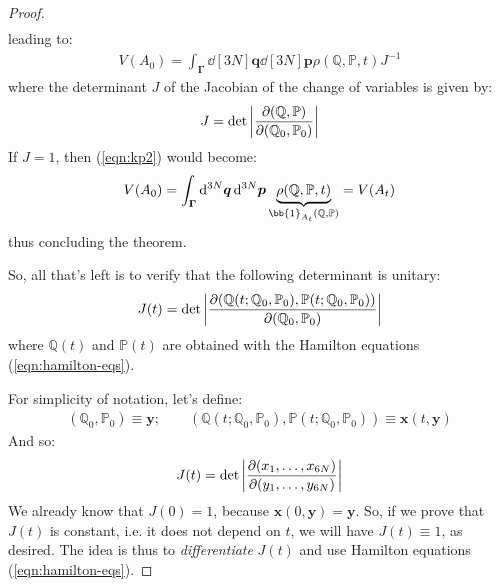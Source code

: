\documentclass[../../main.tex]{subfiles}
\begin{document}
\begin{proof}
\begin{align}
    \end{align}
    leading to:
    \begin{align*}
        V(A_0) = \int_{\bm{\Gamma}} \dd[3N]{\bm{q}} \dd[3N]{\bm{p}} \rho(\mathbb{Q}, \mathbb{P}, t) J^{-1} 
    \end{align*}
    where the determinant $J$ of the Jacobian of the change of variables is given by:
    \begin{align*}
        J = \operatorname{det}\left| \pdv{(\mathbb{Q}, \mathbb{P})}{(\mathbb{Q}_0, \mathbb{P}_0)}\right|
    \end{align*}
    If $J = 1$, then (\ref{eqn:kp2}) would become:
    \begin{align*}
        V(A_0) = \int_{\bm{\Gamma}} \dd[3N]{\bm{q}} \dd[3N]{\bm{p}} \underbrace{\rho(\mathbb{Q}, \mathbb{P}, t)}_{\bb{1}_{A_t}(\mathbb{Q}, \mathbb{P})} = V(A_t)
    \end{align*} 
    thus concluding the theorem.

    \medskip

    So, all that's left is to verify that the following determinant is unitary:
    \begin{align*}
        J(t) = \operatorname{det}\left| \pdv{(\mathbb{Q}(t; \mathbb{Q}_0, \mathbb{P}_0), \mathbb{P}(t; \mathbb{Q}_0, \mathbb{P}_0))}{(\mathbb{Q}_0, \mathbb{P}_0)}\right|
    \end{align*}
    where $\mathbb{Q}(t)$ and $\mathbb{P}(t)$ are obtained with the Hamilton equations (\ref{eqn:hamilton-eqs}). 

    \medskip

    For simplicity of notation, let's define:
    \begin{align}\label{eqn:simplicity-not}
        (\mathbb{Q}_0, \mathbb{P}_0) \equiv \bm{y}; \qquad (\mathbb{Q}(t; \mathbb{Q}_0, \mathbb{P}_0), \mathbb{P}(t; \mathbb{Q}_0, \mathbb{P}_0)) \equiv \bm{x}(t, \bm{y})
    \end{align}
    And so:
    \begin{align*}
        J(t) = \operatorname{det}\left| \pdv{(x_1,\dots, x_{6N})}{(y_1, \dots, y_{6N})}\right|
    \end{align*}
    We already know that $J(0) = 1$, because $\bm{x}(0,\bm{y}) = \bm{y}$. So, if we prove that $J(t)$ is constant, i.e. it does not depend on $t$, we will have $J(t) \equiv 1$, as desired. The idea is thus to \textit{differentiate} $J(t)$ and use Hamilton equations (\ref{eqn:hamilton-eqs}).
    
    \medskip


\end{proof}
\end{document}
